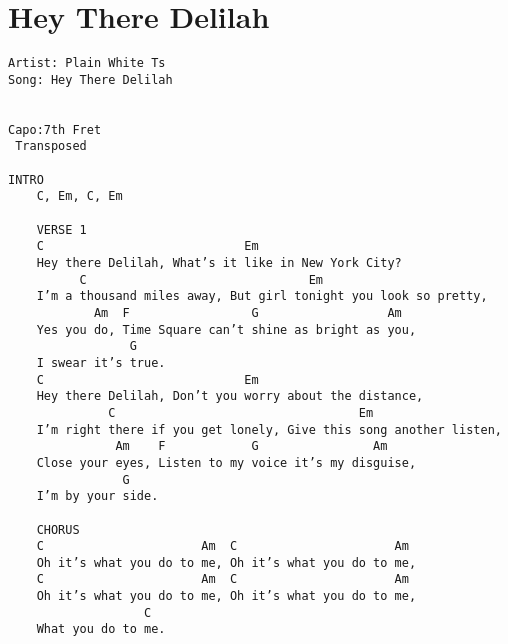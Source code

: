 \documentclass[leqno]{memoir}
\begin{document}
\chapter{Hey There Delilah}
\begin{verbatim}
Artist: Plain White Ts
Song: Hey There Delilah


Capo:7th Fret
 Transposed

INTRO
    C, Em, C, Em
    
    VERSE 1
    C                            Em 
    Hey there Delilah, What’s it like in New York City?
          C                               Em 
    I’m a thousand miles away, But girl tonight you look so pretty,
            Am  F                 G                  Am 
    Yes you do, Time Square can’t shine as bright as you,
                 G 
    I swear it’s true.
    C                            Em 
    Hey there Delilah, Don’t you worry about the distance,
              C                                  Em 
    I’m right there if you get lonely, Give this song another listen,
               Am    F            G                Am 
    Close your eyes, Listen to my voice it’s my disguise,
                G 
    I’m by your side.
    
    CHORUS
    C                      Am  C                      Am 
    Oh it’s what you do to me, Oh it’s what you do to me,
    C                      Am  C                      Am           
    Oh it’s what you do to me, Oh it’s what you do to me,
                   C 
    What you do to me.
\end{verbatim}
\newpage
\end{document}
